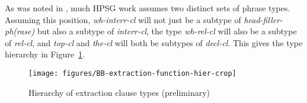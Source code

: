 \documentclass[output=paper
,notxmath 
 	        ,biblatex
                ,babelshorthands
                ,newtxmath
                ,draftmode
                ,colorlinks, citecolor=brown
]{langscibook}
\begin{document}
As was noted in , much HPSG work assumes two distinct sets of
phrase types. Assuming this position, \emph{wh-interr-cl} will not just
be a subtype of \emph{head-filler-ph(rase)} but also a subtype of
\emph{interr-cl}, the type \emph{wh-rel-cl} will also be a subtype of
\emph{rel-cl}, and \emph{top-cl} and \emph{the-cl} will both be subtypes
of \emph{decl-cl}. This gives the type hierarchy in Figure~\ref{fig:UDC:49}.

\begin{figure}
  \centering

  \texttt{[image: figures/BB-extraction-function-hier-crop]}
  \caption{\label{fig:UDC:49}Hierarchy of extraction clause types (preliminary)}
  
\end{figure}
\end{document}
